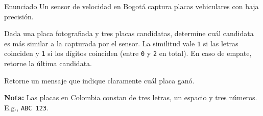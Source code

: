 \documentclass{ip-quiz}
\begin{document}
\makeheader
\maketitle

\begin{sectionbox}{Enunciado}
Un sensor de velocidad en Bogotá captura placas vehiculares con baja precisión.

Dada una placa fotografiada y tres placas candidatas, determine cuál candidata es más similar a la capturada por el sensor. La similitud vale \texttt{1} si las letras coinciden y \texttt{1} si los dígitos coinciden (entre \texttt{0} y \texttt{2} en total). En caso de empate, retorne la última candidata.

Retorne un mensaje que indique claramente cuál placa ganó.

\textbf{Nota: } Las placas en Colombia constan de tres letras, un espacio y tres números. E.g., \texttt{ABC 123}.
\end{sectionbox}

\pagebreak
\end{document}
